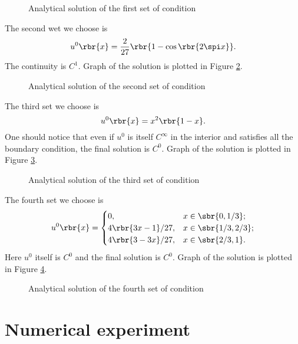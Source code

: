 \documentclass[english, nochinese]{pnote}
\begin{document}
\begin{figure}[htbp]
\centering

\caption{Analytical solution of the first set of condition}
\label{Fig:Ana1}
\end{figure}

The second wet we choose is
\begin{equation}
u^0 \rbr{x} = \frac{2}{27} \rbr{ 1 - \cos \rbr{ 2 \spi x } }.
\end{equation}
The continuity is $C^1$. Graph of the solution is plotted in Figure \ref{Fig:Ana2}.

\begin{figure}[htbp]
\centering

\caption{Analytical solution of the second set of condition}
\label{Fig:Ana2}
\end{figure}

The third set we choose is
\begin{equation}
u^0 \rbr{x} = x^2 \rbr{ 1 - x }.
\end{equation}
One should notice that even if $u^0$ is itself $C^{\infty}$ in the interior and satisfies all the boundary condition, the final solution is $C^0$. Graph of the solution is plotted in Figure \ref{Fig:Ana3}.

\begin{figure}[htbp]
\centering

\caption{Analytical solution of the third set of condition}
\label{Fig:Ana3}
\end{figure}

The fourth set we choose is
\begin{equation}
u^0 \rbr{x} =
\begin{cases}
0, & x \in \sbr{ 0, 1 / 3 }; \\
4 \rbr{ 3 x - 1 } / 27, & x \in \sbr{ 1 / 3, 2 / 3 }; \\
4 \rbr{ 3 - 3 x } / 27, & x \in \sbr{ 2 / 3, 1 }.
\end{cases}
\end{equation}
Here $u^0$ itself is $C^0$ and the final solution is $C^0$. Graph of the solution is plotted in Figure \ref{Fig:Ana4}.

\begin{figure}[htbp]
\centering

\caption{Analytical solution of the fourth set of condition}
\label{Fig:Ana4}
\end{figure}

\section{Numerical experiment}
\end{document}
